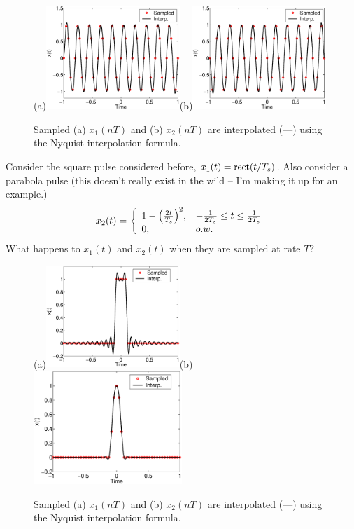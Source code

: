 \begin{figure}[htbp]
  (a)\includegraphics[width=0.45\textwidth]{../images/plotInterpolatedSin_f5.eps}(b)\includegraphics[width=0.45\textwidth]{../images/plotInterpolatedSin_f20.eps}
  \caption{Sampled (a) $x_1(nT)$ and (b) $x_2(nT)$ are interpolated (---) using the Nyquist interpolation formula.}
  \label{F:NyquistInterpolations_SinusoidalSignals}
\end{figure}


 Consider the square pulse
considered before, $x_1(t) = \mbox{rect}(t/T_s)$.  Also consider a
parabola pulse (this doesn't really exist in the wild -- I'm making it up for an example.)
\[
  x_2(t) = { \left\{\begin{array}{ll} {1- \left(\frac{2t}{T_s}\right)^2}, & {-\frac{1}{2T_s} \le t \le \frac{1}{2T_s}} \\ 0, & o.w. \end{array}\right. }
\]
What happens to $x_1(t)$ and $x_2(t)$ when they are sampled at rate
$T$?

\begin{figure}[htbp]
  (a)\includegraphics[width=0.45\textwidth]{../images/plotEgNyquistInterpolation_SquarePulse.eps}(b)\includegraphics[width=0.5\textwidth]{../images/plotEgNyquistInterpolation_ParabolaPulse.eps}
  \caption{Sampled (a) $x_1(nT)$ and (b) $x_2(nT)$ are interpolated (---) using the Nyquist interpolation formula.}
  \label{F:NyquistInterpolations}
\end{figure}

